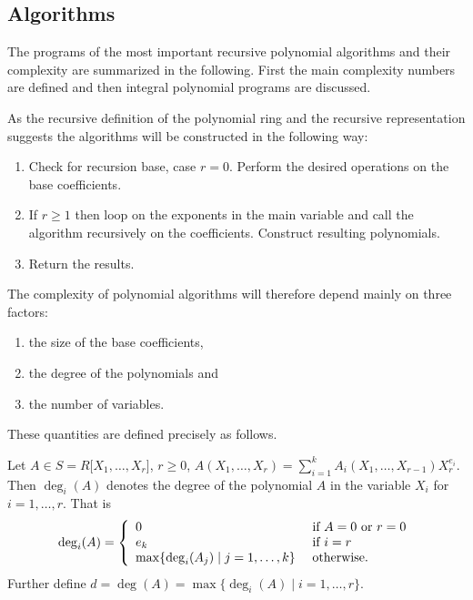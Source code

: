 \subsection{Algorithms} %

The programs of the most important recursive polynomial algorithms 
and their complexity are summarized in the following.
First the main complexity numbers are defined 
and then integral polynomial programs are discussed.

As the recursive definition of the polynomial ring 
and the recursive representation suggests 
the algorithms will be constructed in the following way:
\begin{enumerate}
\item Check for recursion base, case $r= 0$. 
      Perform the desired operations on the base coefficients. 
\item If $r \geq 1$ then 
      loop on the exponents in the main variable 
      and call the algorithm recursively on the coefficients. 
      Construct resulting polynomials.
\item Return the results. 
\end{enumerate}

The complexity of polynomial algorithms will 
therefore depend mainly on three factors:
\begin{enumerate}
\item the size of the base coefficients,
\item the degree of the polynomials and
\item the number of variables.  
\end{enumerate}
These quantities are defined precisely as follows.

Let $A \in S = R \lbrack X_1, \ldots, X_r \rbrack$, 
$r \geq 0$,
$A(X_1, \ldots, X_r) = 
   \sum_{i=1}^{k} A_i(X_1, \ldots, X_{r-1}) X_r^{e_i}$.
Then $\deg_i (A)$ denotes the degree of the polynomial $A$ 
in the variable $X_i$ for $i=1,\ldots,r$.
That is 
$$
  \deg_i (A) = \left\{
               \begin{array}{ll}
                      0   & \mbox{\rm \ if\ } A = 0 
                            \mbox{\rm \ or\ } r = 0 \\
                      e_k & \mbox{\rm \ if\ } i = r \\
                      \max \{ \deg_i (A_j) \mid j=1, \ldots, k \} & 
                            \mbox{\rm \ otherwise}. 
               \end{array}
               \right.
$$
Further define 
$d = \deg (A) = \max \{ \deg_i (A) \mid i=1, \ldots, r \}$.


